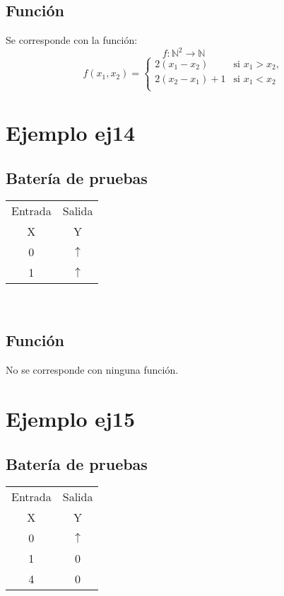\documentclass[a4paper]{article}
\begin{document}
  		 	\subsection{Función}
  		 		Se corresponde con la función:
  		 		$$f:\mathbb{N}^2 \longrightarrow \mathbb{N}$$
  		 		\begin{equation*}
  		 			f(x_1, x_2) = \left\{
  		 			\begin{array}{rl}
  					2(x_1 - x_2) & \text{si } x_1 > x_2, \\
  					2(x_2 - x_1)+1 & \text{si } x_1 < x_2 \\
  					\end{array} \right.
  				\end{equation*}

  		\section{Ejemplo ej14}
  			\subsection{Batería de pruebas}
  			\begin{center}
  				\begin{tabular}{|c|c|} \hline
  					\multicolumn{1}{|l|}{Entrada}&\multicolumn{1}{l|}{Salida}\\
  				X & Y \\
  					\hline
  				0 & $\uparrow$ \\
  				1 & $\uparrow$ \\
  					\hline
  				\end{tabular}\\
  			\end{center}
  			\subsection{Función}
  				No se corresponde con ninguna función.

  		\section{Ejemplo ej15}
  			\subsection{Batería de pruebas}
  			\begin{center}
  				\begin{tabular}{|c|c|} \hline
  					\multicolumn{1}{|l|}{Entrada}&\multicolumn{1}{l|}{Salida}\\
  				X & Y \\
  					\hline
  				0 & $\uparrow$ \\
  				1 & 0 \\
  				4 & 0 \\
  					\hline
  				\end{tabular}\\
  			\end{center}
\end{document}
